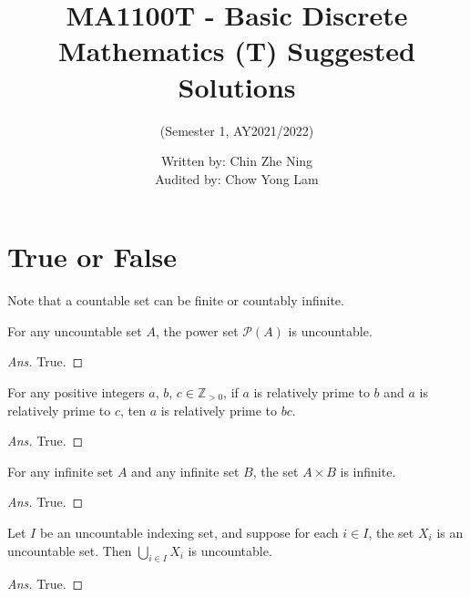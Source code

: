 \documentclass[12pt]{article}
\newenvironment{problem}[2][Problem]{\begin{trivlist}
\item[\hskip \labelsep {\bfseries #1}\hskip \labelsep {\bfseries #2.}]}{\end{trivlist}}
\begin{document}
\setlength{\parindent}{0pt}
 
\title{MA1100T - Basic Discrete Mathematics (T) Suggested Solutions}
\author{(Semester 1, AY2021/2022)}
\date{Written by: Chin Zhe Ning\\Audited by: Chow Yong Lam}
\maketitle
 
\section{True or False}
Note that a countable set can be finite or countably infinite.

\begin{problem}{1}
For any uncountable set $A$, the power set $\mathcal{P}(A)$ is uncountable.
\end{problem}

\begin{proof}[Ans]
True.

\end{proof}

\begin{problem}{2}
For any positive integers $a$, $b$, $c \in \mathbb{Z}_{> 0}$, if $a$ is relatively prime to $b$ and $a$ is relatively prime to $c$, ten $a$ is relatively prime to $bc$.
\end{problem}

\begin{proof}[Ans]
True.

\end{proof}

\begin{problem}{3}
For any infinite set $A$ and any infinite set $B$, the set $A \times B$ is infinite.
\end{problem}

\begin{proof}[Ans]
True.

\end{proof}

\begin{problem}{4}
Let $I$ be an uncountable indexing set, and suppose for each $i \in I$, the set $X_i$ is an uncountable set. Then $\bigcup_{i \in I} X_{i}$ is uncountable.
\end{problem}

\begin{proof}[Ans]
True.

\end{proof}
\end{document}
